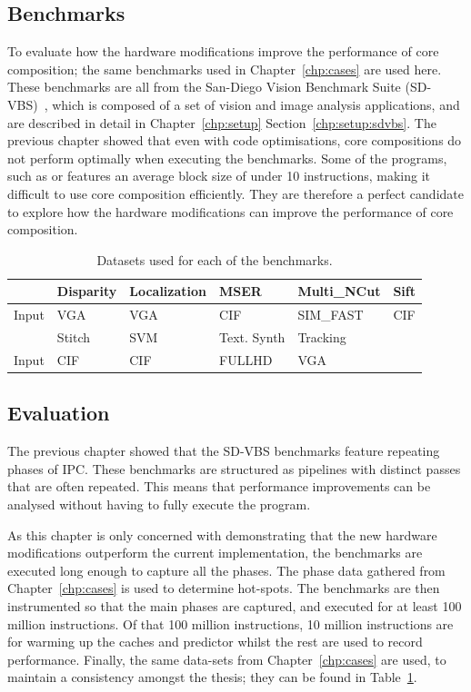 \subsection{Benchmarks}
To evaluate how the hardware modifications improve the performance of core composition; the same benchmarks used in Chapter~\ref{chp:cases} are used here.
These benchmarks are all from the San-Diego Vision Benchmark Suite (SD-VBS)~\cite{sdvbs}, which is composed of a set of vision and image analysis applications, and are described in detail in Chapter~\ref{chp:setup} Section~\ref{chp:setup:sdvbs}.
The previous chapter showed that even with code optimisations, core compositions do not perform optimally when executing the benchmarks.
Some of the programs, such as  or  features an average block size of under 10 instructions, making it difficult to use core composition efficiently.
They are therefore a perfect candidate to explore how the hardware modifications can improve the performance of core composition.

\begin{table}[t]
  \smaller
  \centering
 \begin{tabular} {| l | l | l | l | l | l | }
 \hline
   & \cellcolor[gray]{0.7}Disparity & \cellcolor[gray]{0.7} Localization& \cellcolor[gray]{0.7} MSER& \cellcolor[gray]{0.7} Multi\_NCut& \cellcolor[gray]{0.7} Sift\\ \hline
Input&	VGA  & VGA & CIF  & SIM\_FAST& CIF\\ \hline
	
	 & \cellcolor[gray]{0.7} Stitch & \cellcolor[gray]{0.7} SVM & \cellcolor[gray]{0.7} Text. Synth & \cellcolor[gray]{0.7} Tracking&\\ \hline
	  Input & CIF& CIF& FULLHD& VGA &\\ \hline

	\end{tabular}
  \caption{Datasets used for each of the benchmarks.}\label{tab:sd-data2}
\end{table}
\subsection{Evaluation} 
The previous chapter showed that the SD-VBS benchmarks feature repeating phases of IPC.
These benchmarks are structured as pipelines with distinct passes that are often repeated.
This means that performance improvements can be analysed without having to fully execute the program.

As this chapter is only concerned with demonstrating that the new hardware modifications outperform the current implementation, the benchmarks are executed long enough to capture all the phases.
The phase data gathered from Chapter~\ref{chp:cases} is used to determine hot-spots.
The benchmarks are then instrumented so that the main phases are captured, and executed for at least 100 million instructions.
Of that 100 million instructions, 10 million instructions are for warming up the caches and predictor whilst the rest are used to record performance.
Finally, the same data-sets from Chapter~\ref{chp:cases} are used, to maintain a consistency amongst the thesis; they can be found in Table~\ref{tab:sd-data2}.

